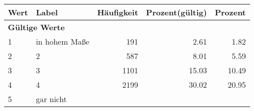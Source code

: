     \begin{longtable}{lXrrr}
     \toprule
     \textbf{Wert} & \textbf{Label} & \textbf{Häufigkeit} & \textbf{Prozent(gültig)} & \textbf{Prozent} \\
     \endhead
     \midrule
     \multicolumn{5}{l}{\textbf{Gültige Werte}}\\

     1 &
     \multicolumn{1}{X}{ in hohem Maße   } &


       \num{191} &
       \num[round-mode=places,round-precision=2]{2,61} &
         \num[round-mode=places,round-precision=2]{1,82} \\

     2 &
     \multicolumn{1}{X}{ 2   } &


       \num{587} &
       \num[round-mode=places,round-precision=2]{8,01} &
         \num[round-mode=places,round-precision=2]{5,59} \\

     3 &
     \multicolumn{1}{X}{ 3   } &


       \num{1101} &
       \num[round-mode=places,round-precision=2]{15,03} &
         \num[round-mode=places,round-precision=2]{10,49} \\

     4 &
     \multicolumn{1}{X}{ 4   } &


       \num{2199} &
       \num[round-mode=places,round-precision=2]{30,02} &
         \num[round-mode=places,round-precision=2]{20,95} \\

     5 &
     \multicolumn{1}{X}{ gar nicht   } &



\end{longtable}
